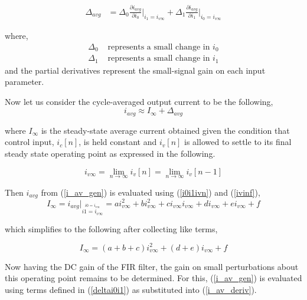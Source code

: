 \documentclass[conference]{IEEEtran}
\begin{document}
\begin{align}
\Delta{_{avg}} &= \Delta{_0}\frac{\partial i_{avg}}{\partial i_0}\bigg|_{i_1=i_{v\infty}} + \Delta{_1}\frac{\partial i_{avg}}{\partial i_1}\bigg|_{i_0=i_{v\infty}} 
  \label{i_av_deriv}
\end{align}

where,
\begin{align}
	\Delta_0 & \text{ represents a small change in } i_0 \nonumber \\
	\Delta_1 & \text{ represents a small change in } i_1 
	\label{deltai0i1}
\end{align}
and the partial derivatives represent the small-signal gain on each input parameter.

Now let us consider the cycle-averaged output current to be the following,
\begin{equation}	
	i_{avg} \approx I_{\infty} + \Delta_{avg}
\end{equation}

where $I_{\infty}$ is the steady-state average current obtained given the condition that control input, $i_c[n]$, is held constant and $i_v[n]$ is allowed to settle to its final steady state operating point as expressed in the following.

\begin{equation}
	i_{v\infty} = \lim_{n \to \infty} i_{v}[n] = \lim_{n \to \infty}  i_{v}[n-1]
	\label{ivinf}
\end{equation}

Then $i_{avg}$ from (\ref{i_av_gen}) is evaluated using (\ref{i0i1ivn}) and (\ref{ivinf}),
\begin{equation}
	I_{\infty} = i_{avg} \bigg|_{\stackrel{i0=i_{v \infty}}{i1=i_{v \infty}}} = a i_{v \infty}^2+b i_{v \infty}^2+c i_{v \infty}i_{v \infty}+d i_{v \infty}+e i_{v \infty}+f 
\end{equation}

which simplifies to the following after collecting like terms,

\begin{equation}
I_{\infty} = (a + b +c)i_{v \infty}^2 + (d+e)i_{v \infty} + f
\label{iavg_steady_state}
\end{equation}

Now having the DC gain of the FIR filter, the gain on small perturbations about this operating point remains to be determined.  For this,  (\ref{i_av_gen}) is evaluated using terms defined in (\ref{deltai0i1}) as substituted into (\ref{i_av_deriv}).
\end{document}
